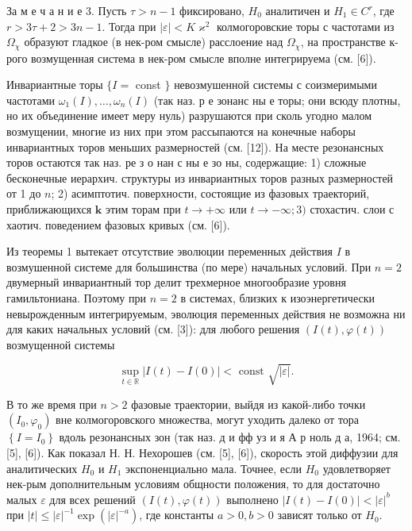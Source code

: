 \documentclass[10pt]{article}
\begin{document}
За м е ч а н и е 3. Пусть $\tau>n-1$ фиксировано, $H_{0}$ аналитичен и $H_{1} \in C^{r}$, где $r>3 \tau+2>3 n-1$. Тогда при $|\varepsilon|<K \varkappa^{2}$ колмогоровские торы с частотами из $\Omega_{\chi}$ образуют гладкое (в нек-ром смысле) расслоение над $\Omega_{\chi}$, на пространстве к-рого возмущенная система в нек-ром смысле вполне интегрируема (см. [6]).



Инвариантные торы $\{I=$ const $\}$ невозмушенной системы с соизмеримыми частотами $\omega_{1}(I), \ldots, \omega_{n}(I)$ (так наз. р е зонанс ны е торы; они всюду плотны, но их объединение имеет меру нуль) разрушаются при сколь угодно малом возмущении, многие из них при этом рассыпаются на конечные наборы инвариантных торов меньших размерностей (см. [12]). На месте резонансных торов остаются так наз. ре з о нан с ны е зо ны, содержащие: 1) сложные бесконечные иерархич. структуры из инвариантных торов разных размерностей от 1 до $n$; 2) асимптотич. поверхности, состоящие из фазовых траекторий, приближающихся $\mathbf{k}$ этим торам при $t \rightarrow+\infty$ или $t \rightarrow-\infty ; 3)$ стохастич. слои с хаотич. поведением фазовых кривых (см. [6]).



Из теоремы 1 вытекает отсутствие эволюции переменных действия $I$ в возмушенной системе для большинства (по мере) начальных условий. При $n=2$ двумерный инвариантный тор делит трехмерное многообразие уровня гамильтониана. Поэтому при $n=2$ в системах, близких к изоэнергетически невырожденным интегрируемым, эволюция переменных действия не возможна ни для каких начальных условий (см. [3]): для любого решения $(I(t), \varphi(t))$ возмущенной системы



\[

\sup _{t \in \mathbb{R}}|I(t)-I(0)|<\text { const } \sqrt{|\varepsilon|} .

\]



В то же время при $n>2$ фазовые траектории, выйдя из какой-либо точки $\left(I_{0}, \varphi_{0}\right)$ вне колмогоровского множества, могут уходить далеко от тора $\left\{I=I_{0}\right\}$ вдоль резонансных зон (так наз. д и фф уз и я А р ноль д а, 1964; см. [5], [6]). Как показал Н. Н. Нехорошев (см. [5], [6]), скорость этой диффузии для аналитических $H_{0}$ и $H_{1}$ экспоненциально мала. Точнее, если $H_{0}$ удовлетворяет нек-рым дополнительным условиям общности положения, то для достаточно малых $\varepsilon$ для всех решений $(I(t), \varphi(t))$ выполнено $|I(t)-I(0)|<|\varepsilon|^{b}$ при $|t| \leqslant|\varepsilon|^{-1} \exp \left(|\varepsilon|^{-a}\right)$, где константы $a>0, b>0$ зависят только от $H_{0}$.
\end{document}
